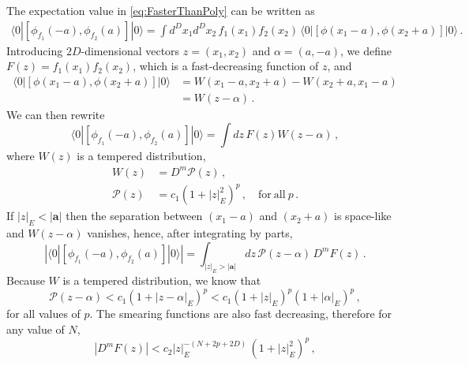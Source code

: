 The expectation value in \eqref{eq:FasterThanPoly} can be written as
\begin{align}
    \label{eq:ExpComm}
    \langle 0 |
        \left[ \phi_{f_1}(-a), \phi_{f_2}(a)\right]
        | 0 \rangle =
        \int d^Dx_1 d^Dx_2\, f_1(x_1) f_2(x_2)\,
        \langle 0 | 
        \left[\phi(x_1-a), \phi(x_2+a)\right]
        | 0 \rangle\, .
\end{align}
Introducing $2D$-dimensional vectors $z=(x_1,x_2)$ and $\alpha=(a,-a)$, we define 
$F(z) = f_1(x_1) f_2(x_2)$, which is a fast-decreasing function of $z$, and
\begin{align}
    \label{eq:CommZvar}
    \langle 0 | 
        \left[\phi(x_1-a), \phi(x_2+a)\right]
        | 0 \rangle 
        &= W\left(x_1-a,x_2+a\right) - W\left(x_2+a,x_1-a\right) \\
        &= W\left(z-\alpha\right)\, .
\end{align} 
We can then rewrite
\begin{equation}
    \label{eq:SmearedCorrZvar}
    \langle 0 |
        \left[ \phi_{f_1}(-a), \phi_{f_2}(a)\right]
        | 0 \rangle 
        = \int dz\, F(z) W(z-\alpha)\, ,
\end{equation}
where $W(z)$ is a tempered distribution, 
\begin{align}
    \label{eq:WTempDist}
    W(z) &= D^m \mathcal{P}(z)\, , \\
    \mathcal{P}(z) &= c_1 \left(1 + |z|_E^2\right)^p\, , \quad \mathrm{for\ all\ } p\, .
\end{align}
If $|z|_E<|\mathbf{a}|$ then the separation between $(x_1-a)$ and $(x_2+a)$ is space-like 
and $W(z-\alpha)$ vanishes, hence, after integrating by parts, 
\begin{equation}
    \label{eq:CutIntegralW}
    \left|\langle 0 |
        \left[ \phi_{f_1}(-a), \phi_{f_2}(a)\right]
        | 0 \rangle \right| = \int_{|z|_E>|\mathbf{a}|}
        dz\, \mathcal{P}(z-\alpha)\, D^mF(z)\, .
\end{equation}
Because $W$ is a tempered distribution, we know that 
\begin{equation}
    \label{eq:PFastDecrease}
    \mathcal{P}(z-\alpha) < c_1 \left(1 + |z-\alpha|_E\right)^p 
    < c_1 \left(1 + |z|_E\right)^p  \left(1 + |\alpha|_E\right)^p \, ,
\end{equation}
for all values of $p$. The smearing functions are also fast decreasing, therefore for 
any value of $N$, 
\begin{equation}
    \label{eq:SmearFastDecrease}
    \left| D^m F(z)\right| < c_2 \left|z\right|_E^{-(N+2p+2D)}\, \left(1 + |z|_E^2\right)^p \, ,
\end{equation}
